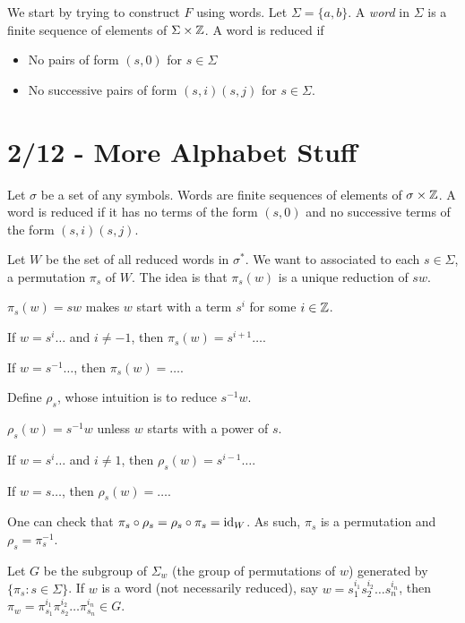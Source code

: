 \documentclass{report}
\begin{document}
We start by trying to construct $F$ using words. Let $\Sigma = \{ a, b\}$. A \emph{word} in $\Sigma$ is a finite sequence of elements of $\Sigma \times \ZZ$. 
\noindent A word is reduced if
\begin{itemize}
    \item No pairs of form $(s, 0)$ for $s \in \Sigma$
    \item No successive pairs of form $(s, i)(s, j)$ for $s \in \Sigma$.
\end{itemize}

\section{2/12 - More Alphabet Stuff}
Let $\sigma$ be a set of any symbols. Words are finite sequences of elements of $\sigma \times \ZZ$. A word is reduced if it has no terms of the form $(s, 0)$ and no successive terms of the form $(s, i)(s, j)$.

Let $W$ be the set of all reduced words in $\sigma^*$. We want to associated to each $s \in \Sigma$, a permutation $\pi_s$ of $W$. The idea is that $\pi_s(w)$ is a unique reduction of $sw$. 

$\pi_s(w)=sw$ makes $w$ start with a term $s^i$ for some $i \in \ZZ$.

If $w = s^i \ldots$ and $i \neq -1$, then $\pi_s(w) = s^{i+1} \ldots$.

If $w = s^{-1}\ldots$, then $\pi_s(w) = \ldots$.

Define $\rho_s$, whose intuition is to reduce $s^{-1}w$. 

$\rho_s(w) = s^{-1}w$ unless $w$ starts with a power of $s$. 

If $w = s^i \ldots$ and $i \neq 1$, then $\rho_s(w) = s^{i-1} \ldots$.

If $w = s \ldots$, then $\rho_s(w) = \ldots$.

One can check that $\pi_s \circ \rho_s = \rho_s \circ \pi_s = \mathrm{id}_W$. As such, $\pi_s$ is a permutation and $\rho_s = \pi_s^{-1}$.

Let $G$ be the subgroup of $\Sigma_w$ (the group of permutations of $w$) generated by $\{\pi_s : s \in \Sigma\}$. If $w$ is a word (not necessarily reduced), say $w = s_1^{i_1}s_2^{i_2}\ldots s_n^{i_n}$, then $\pi_{w} = \pi_{s_1}^{i_1}\pi_{s_2}^{i_2}\ldots \pi_{s_n}^{i_n} \in G$. 
\end{document}
